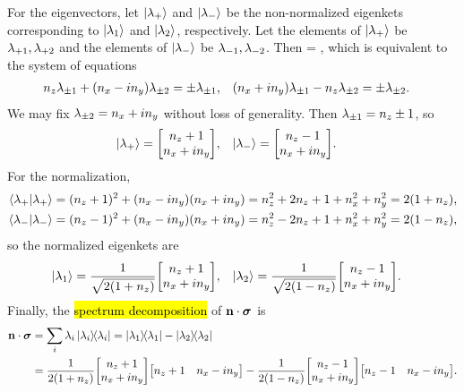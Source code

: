 \begin{solution}
	For the eigenvectors, let $\ket{\lambda_+}$ and $\ket{\lambda_-}$ be the non-normalized eigenkets corresponding to $\ket{\lambda_1}$ and $\ket{\lambda_2}$, respectively.  Let the elements of $\ket{\lambda_+}$ be $\lambda_{+1}, \lambda_{+2}$ and the elements of $\ket{\lambda_-}$ be $\lambda_{-1}, \lambda_{-2}$.  Then
	\beq
		\mqty[ \nz & \nx - i \ny \\ \nx + i \ny & -\nz ] \mqty[ \lampmq \\ \lampmw ] = \pm \mqty[ \lampmq \\ \lampmw ],
	\eeq
	which is equivalent to the system of equations
	\begin{align*}
		n_z \lambda_{\pm1} + (n_x - i n_y) \lambda_{\pm2} &= \pm\lambda_{\pm1}, &
		(n_x + i n_y) \lambda_{\pm1} - n_z \lambda_{\pm2} &= \pm\lambda_{\pm2}.
	\end{align*}
	We may fix $\lambda_{\pm2} = n_x + i n_y$ without loss of generality.  Then $\lambda_{\pm1} = n_z \pm 1$, so
	\begin{align*}
		\klamp &= \mqty[ \nz + 1 \\ \nx + i \ny ], &
		\klamm &= \mqty[ \nz - 1 \\ \nx + i \ny ].
	\end{align*}
	For the normalization,
	\begin{align*}
		\braket{\lambda_+} &= (n_z + 1)^2 + (n_x - i n_y)(n_x + i n_y)
		= n_z^2 + 2 n_z + 1 + n_x^2 + n_y^2
		= 2 (1 + n_z), \\
		\braket{\lambda_-} &= (n_z - 1)^2 + (n_x - i n_y)(n_x + i n_y)
		= n_z^2 - 2 n_z + 1 + n_x^2 + n_y^2
		= 2 (1 - n_z),
	\end{align*}
	so the normalized eigenkets are
	\begin{align*}
		\klamq &= \frac{1}{\sqrt{2 (1 + \nz)}} \mqty[ \nz + 1 \\ \nx + i \ny ], &
		\klamw &= \frac{1}{\sqrt{2 (1 - \nz)}} \mqty[ \nz - 1 \\ \nx + i \ny ].
	\end{align*}
	Finally, the \hl{spectrum decomposition} of $\mathbf{n} \cdot \boldsymbol{\sigma}$ is
	\begin{align}
		\nds &= \sum_{i} \lam_i \ketbra{\lam_i}
		= \ketbra{\lamq} - \ketbra{\lamw} \notag \\
		&= \frac{1}{2 (1 + \nz)} \mqty[ \nz + 1 \\ \nx + i \ny ] \mqty[ \nz + 1 & \nx - i \ny ] - \frac{1}{2 (1 - \nz)} \mqty[ \nz - 1 \\ \nx + i \ny ] \mqty[ \nz - 1 & \nx - i \ny ]. \label{spec}
	\end{align}
\vfix
\end{solution}

\newcommand{\alp}{\alpha}
\newcommand{\eiands}{e^{i \alp \nds}}
\newcommand{\sumni}{\sum_{n = 0}^\infty}
\newcommand{\sina}{\sin{\alp}}
\newcommand{\cosa}{\cos{\alp}}

